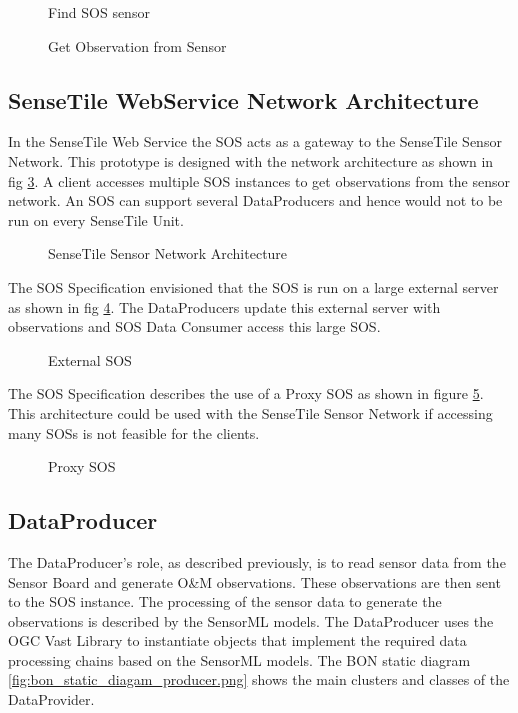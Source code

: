 \documentclass[]{final_report}
\begin{document}
\begin{figure}[h]
\caption{Find SOS sensor}\label{fig:GetMeta}
\end{figure}

\begin{figure}[h]
\caption{Get Observation from Sensor}\label{fig:GetObs}
\end{figure}
\newpage
\subsection{SenseTile WebService Network Architecture}
\label{subsec:SenseTile WebService Network Architecture}
In the SenseTile Web Service the SOS acts as a gateway to the SenseTile Sensor Network. This prototype is designed with the network architecture as shown in fig \ref{fig:Deployment_network}. A client accesses multiple SOS instances to get observations from the sensor network. An SOS can support several DataProducers and hence would not to be run on every SenseTile Unit. 

\begin{figure}[h]
\caption{SenseTile Sensor Network Architecture}\label{fig:Deployment_network}
\end{figure}
The SOS Specification envisioned that the SOS is run on a large external server as shown in fig \ref{fig:Deployment_ext_sos}. The DataProducers update this external server with observations and SOS Data Consumer access this large SOS.
\begin{figure}[h]
\caption{External SOS}\label{fig:Deployment_ext_sos}
\end{figure}

The SOS Specification describes the use of a Proxy SOS as shown in figure \ref{fig:Deployment_sos_aggr}. This architecture could be used with the SenseTile Sensor Network if accessing many SOSs is not feasible for the clients.
\begin{figure}[h]
\caption{Proxy SOS}\label{fig:Deployment_sos_aggr}
\end{figure}

\newpage
\subsection{DataProducer}\label{DataProducerHigh}
The DataProducer's role, as described previously, is to read sensor data from the Sensor Board and generate O\&M observations. These observations are then sent to the SOS instance. The processing of the sensor data to generate the observations is described by the SensorML models. The DataProducer uses the OGC Vast Library to instantiate objects that implement the required data processing chains based on the SensorML models. The BON static diagram \ref{fig:bon_static_diagam_producer.png}
 shows the main clusters and classes of the DataProvider.
\end{document}
